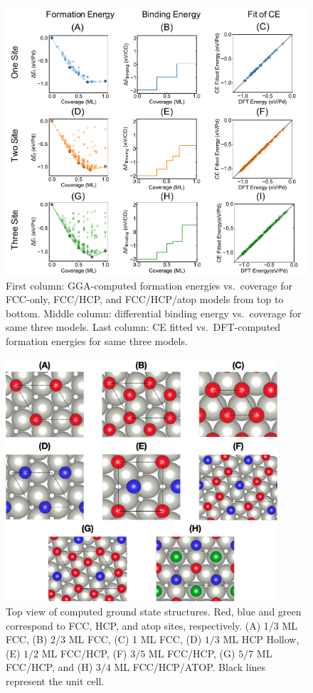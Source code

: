 \documentclass[11pt]{article}
\begin{document}
\begin{figure} [ht]
	\centering
	\includegraphics[width=15cm]{Figure/AllCE.pdf}
	\caption{
		First column: GGA-computed formation energies vs.\ coverage for FCC-only, FCC/HCP, and FCC/HCP/atop models from top to bottom. Middle column: differential binding energy vs.\ coverage for same three models. Last column: CE fitted vs.\ DFT-computed formation energies for same three models.}  
	\label{AllCE}
\end{figure}
\clearpage

\begin{figure} [ht]
	\centering
	\includegraphics[width=0.9\textwidth]{Figure/Gs1.pdf}
	\caption{Top view of computed ground state structures.  Red, blue and green correspond to FCC, HCP, and atop sites, respectively.  (A) 1/3 ML FCC, (B) 2/3 ML FCC, (C) 1 ML FCC, (D) $1/3$ ML HCP Hollow, (E) $1/2$ ML FCC/HCP, (F) $3/5$ ML FCC/HCP, (G) $5/7$ ML FCC/HCP, and (H) $3/4$ ML FCC/HCP/ATOP. Black lines represent the unit cell.}
	\label{GroundStates}
\end{figure}
\end{document}
